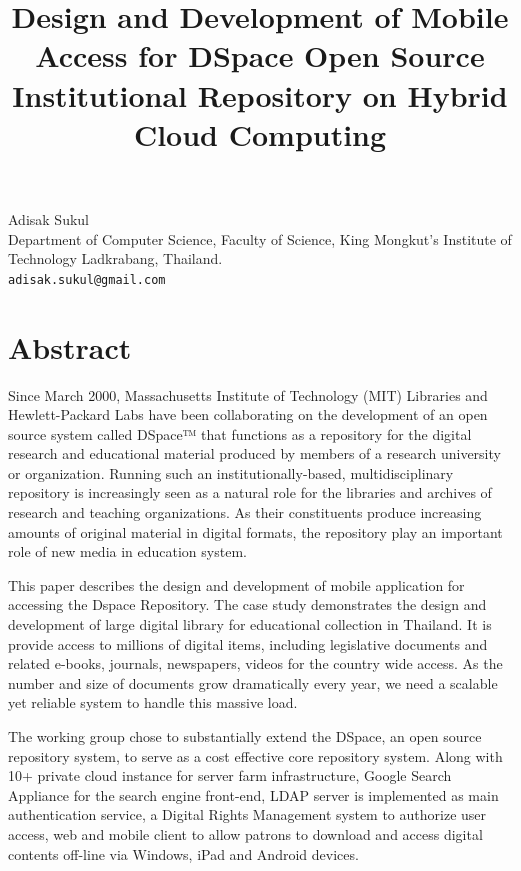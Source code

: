\documentclass[article, A4, 11pt]{llncs}%
\begin{document}
\title{Design and Development of Mobile Access for DSpace Open Source Institutional Repository on Hybrid Cloud Computing}
 \author{} \institute{}
\maketitle
\begin{center}
{\large Adisak Sukul}\\
Department of Computer Science, Faculty of Science, King Mongkut's Institute of Technology Ladkrabang, Thailand.\\
{\tt adisak.sukul@gmail.com}
\end{center}

\section*{Abstract}
Since March 2000, Massachusetts Institute of Technology (MIT) Libraries and Hewlett-Packard Labs have been collaborating on the development of an open source system called DSpace™ that functions as a repository for the digital research and educational material produced by members of a research university or organization. Running such an institutionally-based, multidisciplinary repository is increasingly seen as a natural role for the libraries and archives of research and teaching organizations. As their constituents produce increasing amounts of original material in digital formats, the repository play an important role of new media in education system.

This paper describes the design and development of mobile application for accessing the Dspace Repository. The case study demonstrates the design and development of large digital library for educational collection in Thailand. It is provide access to millions of digital items, including legislative documents and related e-books, journals, newspapers, videos for the country wide access. As the number and size of documents grow dramatically every year, we need a scalable yet reliable system to handle this massive load. 

The working group chose to substantially extend the DSpace, an open source repository system, to serve as a cost effective core repository system. Along with 10+ private cloud instance for server farm infrastructure, Google Search Appliance for the search engine front-end, LDAP server is implemented as main authentication service, a Digital Rights Management system to authorize user access, web and mobile client to allow patrons to download and access digital contents off-line via Windows, iPad and Android devices.
\end{document}

